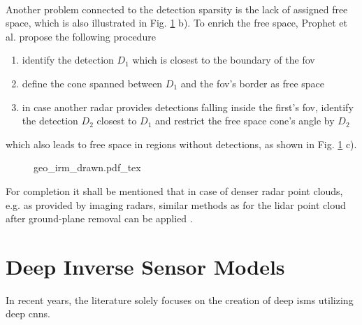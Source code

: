 \\
Another problem connected to the detection sparsity is the lack of assigned free space, which is also illustrated in Fig. \ref{fig:geo_irm_drawn} b). To enrich the free space, Prophet et al. \cite{prophet2018adaptions} propose the following procedure
\begin{enumerate}
	\item identify the detection $D_1$ which is closest to the boundary of the \gls{fov}
	\item define the cone spanned between $D_1$ and the \gls{fov}'s border as free space
	\item in case another radar provides detections falling inside the first's \gls{fov}, identify the detection $D_2$ closest to $D_1$ and restrict the free space cone's angle by $D_2$   
\end{enumerate}
which also leads to free space in regions without detections, as shown in Fig. \ref{fig:geo_irm_drawn} c).
\begin{figure}
	\begin{center}
		{geo_irm_drawn.pdf_tex}
		\caption{\label{fig:geo_irm_drawn}}
	\end{center}
\end{figure} 
For completion it shall be mentioned that in case of denser radar point clouds, e.g. as provided by imaging radars, similar methods as for the lidar point cloud after ground-plane removal can be applied \cite{slutsky2019dual}.
%
\section{Deep Inverse Sensor Models}
\label{sec:deep_isms}
In recent years, the literature solely focuses on the creation of deep \gls{ism}s utilizing deep \gls{cnn}s. 
%
